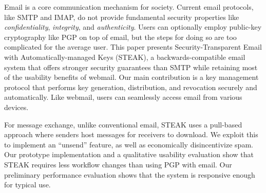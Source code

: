   Email is a core communication mechanism for society.  
Current email protocols, like SMTP and IMAP, do not provide fundamental security 
properties like \emph{confidentiality}, \emph{integrity}, and \emph{authenticity}.  Users can optionally 
employ public-key cryptography like PGP on top of email, but the steps for doing 
so are too complicated for the average user. This paper presents Security-Transparent 
Email with Automatically-managed Keys (STEAK), a backwards-compatible email system 
that offers stronger security guarantees than SMTP while retaining most of the usability 
benefits of webmail.  Our main contribution is a key management protocol that 
performs key generation, distribution, and revocation securely and automatically. 
Like webmail, users can seamlessly access email from various devices.

For message exchange, unlike conventional email, STEAK uses a pull-based approach where senders 
host messages for receivers to download.  We exploit this to implement an ``unsend'' 
feature, as well as economically disincentivize spam. Our prototype implementation 
and a qualitative usability evaluation show that STEAK requires less workflow changes than
using PGP with email. Our preliminary performance evaluation 
shows that the system is responsive enough for typical use.
